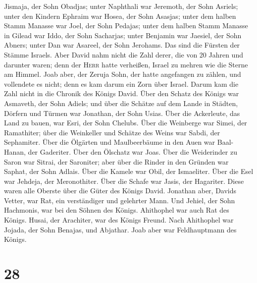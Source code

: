 Jismaja, der Sohn Obadjas; unter Naphthali war Jeremoth, der Sohn
Asriels;  unter den Kindern Ephraim war Hosea, der Sohn
Asasjas; unter dem halben Stamm Manasse war Joel, der Sohn Pedajas;
 unter dem halben Stamm Manasse in Gilead war Iddo, der
Sohn Sacharjas; unter Benjamin war Jaesiel, der Sohn Abners;
 unter Dan war Asareel, der Sohn Jerohams. Das sind die
Fürsten der Stämme Israels.  Aber David nahm nicht die
Zahl derer, die von 20 Jahren und darunter waren; denn der \textsc{Herr}
hatte verheißen, Israel zu mehren wie die Sterne am Himmel.
 Joab aber, der Zeruja Sohn, der hatte angefangen zu
zählen, und vollendete es nicht; denn es kam darum ein Zorn über Israel.
Darum kam die Zahl nicht in die Chronik des Königs David.
 Über den Schatz des Königs war Asmaveth, der Sohn
Adiels; und über die Schätze auf dem Lande in Städten, Dörfern und
Türmen war Jonathan, der Sohn Usias.  Über die
Ackerleute, das Land zu bauen, war Esri, der Sohn Chelubs.
 Über die Weinberge war Simei, der Ramathiter; über die
Weinkeller und Schätze des Weins war Sabdi, der Sephamiter.
 Über die Ölgärten und Maulbeerbäume in den Auen war
Baal-Hanan, der Gaderiter. Über den Ölschatz war Joas. 
Über die Weiderinder zu Saron war Sitrai, der Saroniter; aber über die
Rinder in den Gründen war Saphat, der Sohn Adlais.  Über
die Kamele war Obil, der Ismaeliter. Über die Esel war Jehdeja, der
Meronothiter.  Über die Schafe war Jasis, der Hagariter.
Diese waren alle Oberste über die Güter des Königs David.
 Jonathan aber, Davids Vetter, war Rat, ein verständiger
und gelehrter Mann. Und Jehiel, der Sohn Hachmonis, war bei den Söhnen
des Königs.  Ahithophel war auch Rat des Königs. Husai,
der Arachiter, war des Königs Freund.  Nach Ahithophel
war Jojada, der Sohn Benajas, und Abjathar. Joab aber war Feldhauptmann
des Königs.

\hypertarget{section-27}{%
\section{28}\label{section-27}}

